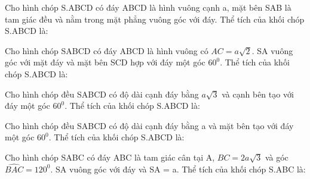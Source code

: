 



\begin{vnmultiplechoice}[ rearrange=yes, keycolumns=5]%

	\begin{question}%
		Cho hình chóp S.ABCD có đáy ABCD là hình vuông cạnh a, mặt bên SAB là tam giác đều và nằm trong mặt phẳng vuông góc với đáy. Thể tích của khối chóp S.ABCD là:

		\datcot
		\bonpa
		{}
		{}
		{}
		{}
	\end{question}

	\begin{question}%
		Cho hình chóp SABCD có đáy ABCD là hình vuông có $AC = a\sqrt 2$. SA vuông góc với mặt đáy và mặt bên SCD hợp với đáy một góc $60^0$. Thể tích của khối chóp S.ABCD là:

		\datcot
		\bonpa
		{}
		{}
		{}
		{}
	\end{question}

	\begin{question}%
		Cho hình chóp đều SABCD có độ dài cạnh đáy bằng $a\sqrt 3$ và cạnh bên tạo với đáy một góc $60^0$. Thể tích của khối chóp S.ABCD là:

		\datcot
		\bonpa
		{}
		{}
		{}
		{}
	\end{question}

	\begin{question}%
		Cho hình chóp đều SABCD có độ dài cạnh đáy bằng a và mặt bên tạo với đáy một góc $60^0$. Thể tích của khối chóp S.ABCD là:

		\datcot
		\bonpa
		{}
		{}
		{}
		{}
	\end{question}

	\begin{question}%
		Cho hình chóp SABC có đáy ABC là tam giác cân tại A, $BC = 2a\sqrt 3$ và góc $\widehat{BAC} = 120^0$. SA vuông góc với đáy và SA = a. Thể tích của khối chóp S.ABC là:

		\datcot
		\bonpa
		{}
		{}
		{}
		{}
	\end{question}


\end{vnmultiplechoice}
